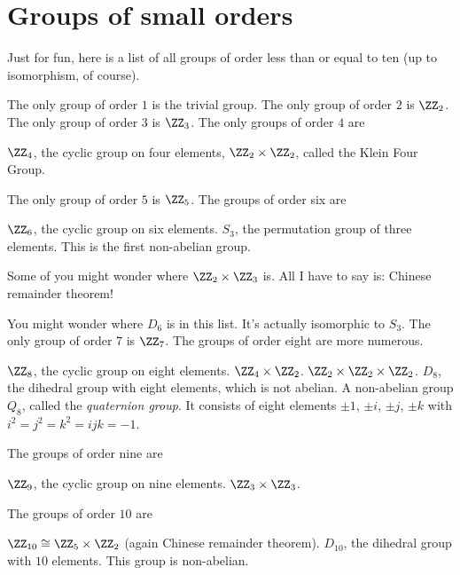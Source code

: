 \section{Groups of small orders}
Just for fun, here is a list of all groups of order less than or equal to ten
(up to isomorphism, of course).
\begin{enumerate}
	\ii The only group of order $1$ is the trivial group.
	\ii The only group of order $2$ is $\Zc 2$.
	\ii The only group of order $3$ is $\Zc 3$.
	\ii The only groups of order $4$ are
	\begin{itemize}
		\ii $\Zc 4$, the cyclic group on four elements,
		\ii $\Zc 2 \times \Zc 2$, called the Klein Four Group.
	\end{itemize}
	\ii The only group of order $5$ is $\Zc 5$.
	\ii The groups of order six are
	\begin{itemize}
		\ii $\Zc 6$, the cyclic group on six elements.
		\ii $S_3$, the permutation group of three elements.
		This is the first non-abelian group.
	\end{itemize}
	Some of you might wonder where $\Zc 2 \times \Zc 3$ is.
	All I have to say is: Chinese remainder theorem!

	You might wonder where $D_6$ is in this list.
	It's actually isomorphic to $S_3$.
	\ii The only group of order $7$ is $\Zc 7$.
	\ii The groups of order eight are more numerous.
	\begin{itemize}
		\ii $\Zc 8$, the cyclic group on eight elements.
		\ii $\Zc 4 \times \Zc 2$.
		\ii $\Zc 2 \times \Zc 2 \times \Zc 2$.
		\ii $D_8$, the dihedral group with eight elements, which is not abelian.
		\ii A non-abelian group $Q_8$, called the \emph{quaternion group}.
		It consists of eight elements $\pm 1$, $\pm i$, $\pm j$, $\pm k$
		with $i^2=j^2=k^2=ijk=-1$.
	\end{itemize}
	\ii The groups of order nine are
	\begin{itemize}
		\ii $\Zc 9$, the cyclic group on nine elements.
		\ii $\Zc 3 \times \Zc 3$.
	\end{itemize}
	\ii The groups of order $10$ are
	\begin{itemize}
		\ii $\Zc{10} \cong \Zc5 \times \Zc2$ (again Chinese remainder theorem).
		\ii $D_{10}$, the dihedral group with $10$ elements.
		This group is non-abelian.
	\end{itemize}
\end{enumerate}

